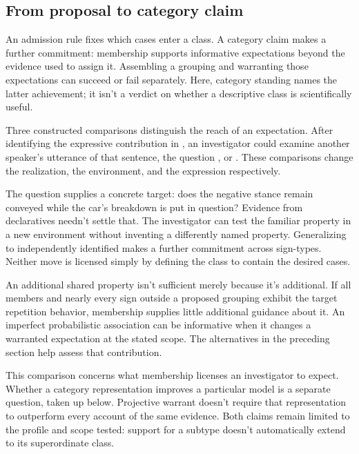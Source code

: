 \documentclass[12pt]{article}
\begin{document}
\subsection{From proposal to category claim}

An admission rule fixes which cases enter a class. A category claim
makes a further commitment: membership supports informative expectations
beyond the evidence used to assign it. Assembling a grouping and
warranting those expectations can succeed or fail separately. Here,
category standing names the latter achievement; it isn't a verdict
on whether a descriptive class is scientifically useful.

Three constructed comparisons distinguish the reach of an expectation.
After identifying the expressive contribution in , an investigator could examine another speaker's utterance
of that sentence, the question ,
or . These comparisons change the
realization, the environment, and the expression respectively.

The question supplies a concrete target: does the negative stance
remain conveyed while the car's breakdown is put in question? Evidence
from declaratives needn't settle that. The investigator can test the
familiar property in a new environment without inventing a differently
named property. Generalizing to independently identified 
makes a further commitment across sign-types. Neither move is licensed
simply by defining the class to contain the desired cases.

An additional shared property isn't sufficient merely because it's
additional. If all members and nearly every sign outside a proposed
grouping exhibit the target repetition behavior, membership supplies
little additional guidance about it. An imperfect probabilistic association can be
informative when it changes a warranted expectation at the stated
scope. The alternatives in the preceding section help assess that
contribution.

This comparison concerns what membership licenses an investigator to
expect. Whether a category representation improves a particular model
is a separate question, taken up below. Projective warrant doesn't
require that representation to outperform every account of the same
evidence. Both claims remain limited to the profile and scope tested:
support for a subtype doesn't automatically extend to its superordinate
class.
\end{document}
